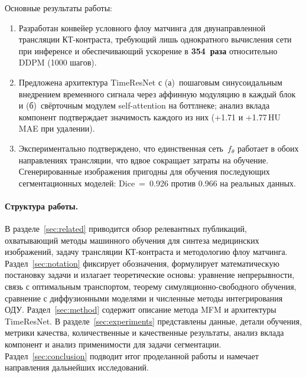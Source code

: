 Основные результаты работы:
\begin{enumerate}
    \item Разработан конвейер условного флоу матчинга для двунаправленной трансляции КТ-контраста, требующий лишь однократного вычисления сети при инференсе и обеспечивающий ускорение в \textbf{354~раза} относительно DDPM (1000 шагов).
    \item Предложена архитектура TimeResNet с (а)~пошаговым синусоидальным внедрением временного сигнала через аффинную модуляцию в каждый блок и (б)~свёрточным модулем self-attention на боттлнеке; анализ вклада компонент подтверждает значимость каждого из них (+1.71 и +1.77\,HU MAE при удалении).
    \item Экспериментально подтверждено, что единственная сеть~$f_\theta$ работает в обоих направлениях трансляции, что вдвое сокращает затраты на обучение. Сгенерированные изображения пригодны для обучения последующих сегментационных моделей: Dice~=~0.926 против 0.966 на реальных данных.
\end{enumerate}

\paragraph{Структура работы.}
В разделе~\ref{sec:related} приводится обзор релевантных публикаций, охватывающий методы машинного обучения для синтеза медицинских изображений, задачу трансляции КТ-контраста и методологию флоу матчинга. Раздел~\ref{sec:notation} фиксирует обозначения, формулирует математическую постановку задачи и излагает теоретические основы: уравнение непрерывности, связь с оптимальным транспортом, теорему симуляционно-свободного обучения, сравнение с диффузионными моделями и численные методы интегрирования ОДУ. Раздел~\ref{sec:method} содержит описание метода MFM и архитектуры TimeResNet. В разделе~\ref{sec:experiments} представлены данные, детали обучения, метрики качества, количественные и качественные результаты, анализ вклада компонент и анализ применимости для задачи сегментации. Раздел~\ref{sec:conclusion} подводит итог проделанной работы и намечает направления дальнейших исследований.

